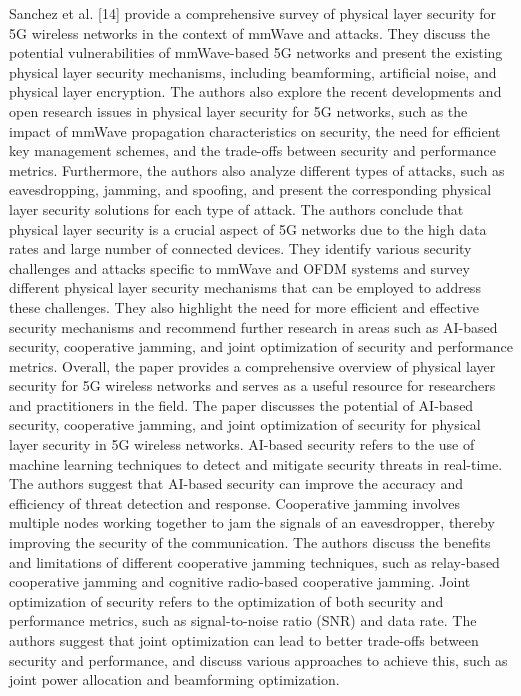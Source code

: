 \documentclass[conference]{IEEEtran}
\begin{document}
Sanchez et al. [14] provide a comprehensive survey of physical layer security for 5G wireless networks in the context of mmWave and attacks. They discuss the potential vulnerabilities of mmWave-based 5G networks and present the existing physical layer security mechanisms, including beamforming, artificial noise, and physical layer encryption.
The authors also explore the recent developments and open research issues in physical layer security for 5G networks, such as the impact of mmWave propagation characteristics on security, the need for efficient key management schemes, and the trade-offs between security and performance metrics.
Furthermore, the authors also analyze different types of attacks, such as eavesdropping, jamming, and spoofing, and present the corresponding physical layer security solutions for each type of attack. The authors conclude that physical layer security is a crucial aspect of 5G networks due to the high data rates and large number of connected devices. They identify various security challenges and attacks specific to mmWave and OFDM systems and survey different physical layer security mechanisms that can be employed to address these challenges. They also highlight the need for more efficient and effective security mechanisms and recommend further research in areas such as AI-based security, cooperative jamming, and joint optimization of security and performance metrics. Overall, the paper provides a comprehensive overview of physical layer security for 5G wireless networks and serves as a useful resource for researchers and practitioners in the field.
The paper discusses the potential of AI-based security, cooperative jamming, and joint optimization of security for physical layer security in 5G wireless networks. AI-based security refers to the use of machine learning techniques to detect and mitigate security threats in real-time. The authors suggest that AI-based security can improve the accuracy and efficiency of threat detection and response.
Cooperative jamming involves multiple nodes working together to jam the signals of an eavesdropper, thereby improving the security of the communication. The authors discuss the benefits and limitations of different cooperative jamming techniques, such as relay-based cooperative jamming and cognitive radio-based cooperative jamming.
Joint optimization of security refers to the optimization of both security and performance metrics, such as signal-to-noise ratio (SNR) and data rate. The authors suggest that joint optimization can lead to better trade-offs between security and performance, and discuss various approaches to achieve this, such as joint power allocation and beamforming optimization.
\end{document}
